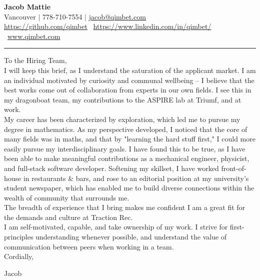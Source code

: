 \documentclass[a4paper,10pt]{article}
\begin{document}
	\begin{center}
		{\huge \bfseries Jacob Mattie} \\[0.75em]
		Vancouver $|$ 778-710-7554 $|$ \href{mailto:jacob@qimbet.com}{jacob@qimbet.com}\\[0.25em]
		
		\href{https://github.com/qimbet}{https://github.com/qimbet} \textbar\ \href{https://www.linkedin.com/in/qimbet/}{https://www.linkedin.com/in/qimbet/} \textbar\
		\href{www.qimbet.com}{www.qimbet.com}
		
	\end{center}
	
	\vspace{-1em}	
	\noindent\rule{\textwidth}{0.4pt}
	\vspace{2.5em}
	
	\noindent

	To the Hiring Team,\\ 
	
	I will keep this brief, as I understand the saturation of the applicant market. I am an individual motivated by curiosity and communal wellbeing -- I believe that the best works come out of collaboration from experts in our own fields. I see this in my dragonboat team, my contributions to the ASPIRE lab at Triumf, and at work. \\
	
	My career has been characterized by exploration, which led me to pursue my degree in mathematics. As my perspective developed, I noticed that the core of many fields was in maths, and that by "learning the hard stuff first," I could more easily pursue my interdisciplinary goals. I have found this to be true, as I have been able to make meaningful contributions as a mechanical engineer, physicist, and full-stack software developer. Softening my skillset, I have worked front-of-house in restaurants \& bars, and rose to an editorial position at my university's student newspaper, which has enabled me to build diverse connections within the wealth of community that surrounds me. \\
	
	The breadth of experience that I bring makes me confident I am a great fit for the demands and culture at Traction Rec.\\
	
	I am self-motivated, capable, and take ownership of my work. I strive for first-principles understanding whenever possible, and understand the value of communication between peers when working in a team. \\
	
	Cordially, \\

	\vspace{2em}



Jacob
	
\end{document}
